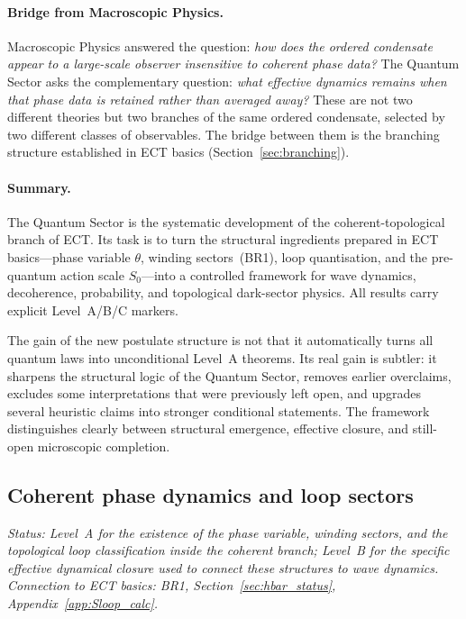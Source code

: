 \documentclass[11pt,a4paper]{article}
\numberwithin{equation}{section}
\begin{document}
\paragraph{Bridge from Macroscopic Physics.}
Macroscopic Physics answered the question:
\emph{how does the ordered condensate appear to a large-scale
observer insensitive to coherent phase data?}
The Quantum Sector asks the complementary question:
\emph{what effective dynamics remains when that phase data is
retained rather than averaged away?}
These are not two different theories but two branches of the
same ordered condensate, selected by two different classes of
observables.
The bridge between them is the branching structure established
in ECT basics (Section~\ref{sec:branching}).

\paragraph{Summary.}
The Quantum Sector is the systematic development of the
coherent-topological branch of ECT.
Its task is to turn the structural ingredients prepared in
ECT basics---phase variable $\theta$, winding sectors~(BR1),
loop quantisation, and the pre-quantum action scale $S_0$---into
a controlled framework for wave dynamics, decoherence,
probability, and topological dark-sector physics.
All results carry explicit Level~A/B/C markers.

The gain of the new postulate structure is not that it automatically
turns all quantum laws into unconditional Level~A theorems.
Its real gain is subtler: it sharpens the structural logic of the
Quantum Sector, removes earlier overclaims, excludes some
interpretations that were previously left open, and upgrades several
heuristic claims into stronger conditional statements.
The framework distinguishes clearly between structural emergence,
effective closure, and still-open microscopic completion.

\subsection{Coherent phase dynamics and loop sectors}
\label{sec:qs_phase_dynamics}

\textit{Status: Level~A for the existence of the phase variable,
winding sectors, and the topological loop classification inside the
coherent branch; Level~B for the specific effective dynamical closure
used to connect these structures to wave dynamics.
Connection to ECT basics: BR1, Section~\ref{sec:hbar_status},
Appendix~\ref{app:Sloop_calc}.}
\end{document}
